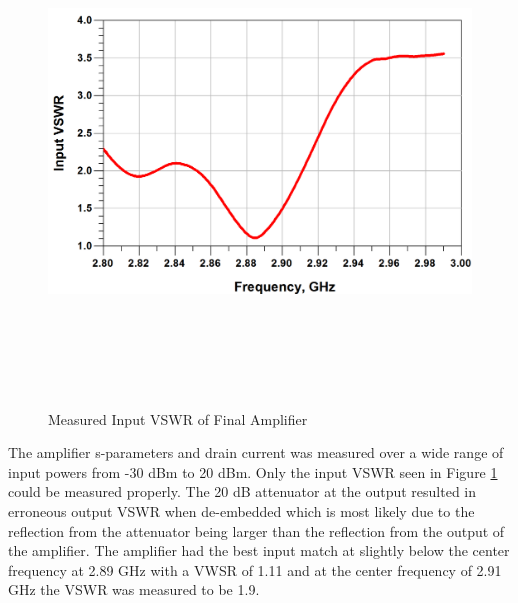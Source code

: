 \begin{figure}
  \centering

  \includegraphics[width=5in,height=5in,keepaspectratio]{figures/test/input_vswr}\\
  \caption{Measured Input VSWR of Final Amplifier}
  \label{fig:input_vswr}
\end{figure}

 The amplifier s-parameters and drain current was measured over a wide range of input powers from -30 dBm to 20 dBm. Only the input VSWR seen in Figure \ref{fig:input_vswr} could be measured properly. The 20 dB attenuator at the output resulted in erroneous output VSWR when de-embedded which is most likely due to the reflection from the attenuator being larger than the reflection from the output of the amplifier. The amplifier had the best input match at slightly below the center frequency at 2.89 GHz with a VWSR of 1.11 and at the center frequency of 2.91 GHz the VSWR was measured to be 1.9.

